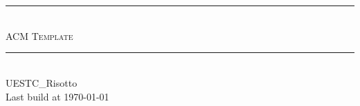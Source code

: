\documentclass[12pt,a4paper]{article}
\begin{document}
    \pagestyle{fancy}
    \lhead{} 
    \chead{} 
    \cfoot{}
    \rfoot{\bfseries\thepage} 
    \renewcommand{\headrulewidth}{0.4pt} 
    \renewcommand{\footrulewidth}{0.4pt}

    \begin{titlepage}
	~
	\clearpage
	\pagestyle{empty}
	
        \begin{center}
        ~\\[160pt]
        
        \hrule\ \\[8pt]
        \fontsize{48pt}{\baselineskip}\selectfont  \textsc{ACM Template}\\[8pt]
        \hrule\ \\[340pt]

        \huge UESTC\_Risotto\\[8pt]
        \Large Last build at \today
        \end{center}
    \end{titlepage}

    \restoregeometry
    
    \tableofcontents
    \clearpage


    
    \clearpage

    
    \clearpage

    
    \clearpage

    
    \clearpage

    
    \clearpage

    
    \clearpage

    
    \clearpage
    
    
    \clearpage
    
    
    \clearpage
\end{document}
